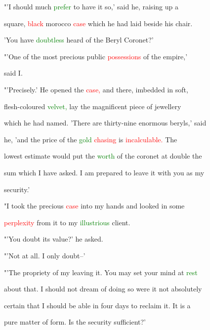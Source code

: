  "'I should much \textcolor{green}{prefer} to have it so,' said he, raising up a

 square, \textcolor{red}{black} morocco \textcolor{red}{case} which he had laid beside his chair.

 'You have \textcolor{green}{doubtless} heard of the Beryl Coronet?'



 "'One of the most \textcolor{BurntOrange}{precious} \textcolor{BurntOrange}{public} \textcolor{red}{possessions} of the empire,'

 said I.



 "'Precisely.' He opened the \textcolor{red}{case,} and there, imbedded in soft,

 flesh-coloured \textcolor{green}{velvet,} lay the \textcolor{BurntOrange}{magnificent} piece of jewellery

 which he had named. 'There are thirty-nine enormous beryls,' said

 he, 'and the price of the \textcolor{green}{gold} \textcolor{red}{chasing} is \textcolor{red}{incalculable.} The

 lowest estimate would put the \textcolor{green}{worth} of the coronet at double the

 sum which I have asked. I am \textcolor{BurntOrange}{prepared} to \textcolor{BurntOrange}{leave} it with you as my

 security.'



 "I took the \textcolor{BurntOrange}{precious} \textcolor{red}{case} into my hands and looked in some

 \textcolor{red}{perplexity} from it to my \textcolor{green}{illustrious} client.



 "'You \textcolor{BurntOrange}{doubt} its value?' he asked.



 "'Not at all. I only \textcolor{BurntOrange}{doubt--'}



 "'The propriety of my \textcolor{BurntOrange}{leaving} it. You may set your mind at \textcolor{green}{rest}

 about that. I should not dream of doing so were it not absolutely

 certain that I should be able in four days to reclaim it. It is a

 pure matter of form. Is the security sufficient?'



